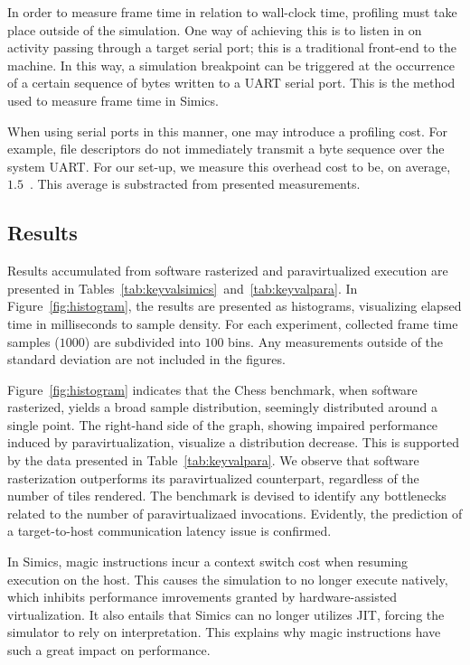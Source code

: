 In order to measure frame time in relation to wall-clock time, profiling must take place outside of the simulation.
One way of achieving this is to listen in on activity passing through a target serial port; this is a traditional front-end to the machine.
In this way, a simulation breakpoint can be triggered at the occurrence of a certain sequence of bytes written to a UART serial port.
This is the method used to measure frame time in Simics.

When using serial ports in this manner, one may introduce a profiling cost.
For example, file descriptors do not immediately transmit a byte sequence over the system UART.
For our set-up, we measure this overhead cost to be, on average, $1.5$~\milli\second .
This average is substracted from presented measurements.

\subsection{Results}
\label{sec:results}
Results accumulated from software rasterized and paravirtualized execution are presented in Tables~\ref{tab:keyvalsimics}~and~\ref{tab:keyvalpara}.
In Figure~\ref{fig:histogram}, the results are presented as histograms, visualizing elapsed time in milliseconds to sample density.
For each experiment, collected frame time samples ($1000$) are subdivided into $100$ bins.
Any measurements outside of the standard deviation are not included in the figures.

Figure~\ref{fig:histogram} indicates that the Chess benchmark, when software rasterized, yields a broad sample distribution, seemingly distributed around a single point.
The right-hand side of the graph, showing impaired performance induced by paravirtualization, visualize a distribution decrease.
This is supported by the data presented in Table~\ref{tab:keyvalpara}.
We observe that software rasterization outperforms its paravirtualized counterpart, regardless of the number of tiles rendered.
The benchmark is devised to identify any bottlenecks related to the number of paravirtualizaed invocations.
Evidently, the prediction of a target-to-host communication latency issue is confirmed.

In Simics, magic instructions incur a context switch cost when resuming execution on the host.
This causes the simulation to no longer execute natively, which inhibits performance imrovements granted by hardware-assisted virtualization.
It also entails that Simics can no longer utilizes JIT, forcing the simulator to rely on interpretation.
This explains why magic instructions have such a great impact on performance.

